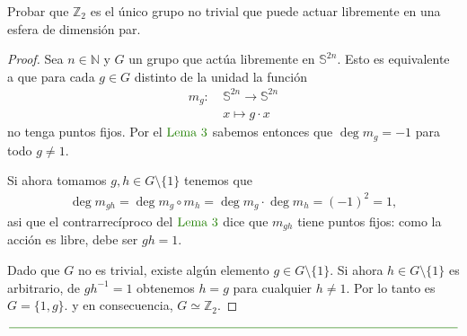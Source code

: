 \documentclass[11pt]{article}
\newcommand{\N}{\mathbb{N}}
\newcommand{\Z}{\mathbb{Z}}
\newcommand{\Ss}{\mathbb{S}}
\newcommand{\paint}[1]{\color{color}{#1}}
\newenvironment{exercise}[2][Ejercicio]{\begin{trivlist}
\item[\hskip \labelsep \paint{{\bfseries #1}}\hskip \labelsep {\bfseries #2.}]}{\end{trivlist}}
\begin{document}
\begin{exercise}{1} Probar que $\Z_2$ es el \'unico grupo no trivial que puede actuar libremente en una esfera de dimensi\'on par.
\end{exercise}
\begin{proof} Sea $n \in \N$ y $G$ un grupo que act\'ua libremente en $\Ss^{2n}$. Esto es equivalente a que para cada $g \in G$ distinto de la unidad la funci\'on 
\begin{align*}
m_g : \ & \Ss^{2n} \rightarrow \Ss^{2n}\\
&x \longmapsto g \cdot x
\end{align*}
no tenga puntos fijos. Por el $\paint{\text{Lema $3$}}$ sabemos entonces que $\deg m_g = -1$ para todo $g \neq 1$. 

Si ahora tomamos $g,h \in G \setminus \{1\}$ tenemos que
\begin{align*}
\deg m_{gh} = \deg m_g \circ m_h = \deg m_g \cdot \deg m_h = (-1)^2 = 1,
\end{align*}
asi que el contrarrec\'iproco del $\paint{\text{Lema $3$}}$ dice que $m_{gh}$ tiene puntos fijos: como la acci\'on es libre, debe ser $gh = 1$. 

Dado que $G$ no es trivial, existe alg\'un elemento $g \in G \setminus \{1\}$. Si ahora $h \in G \setminus \{1\}$ es arbitrario, de $gh^{-1} = 1$ obtenemos $h = g$ para cualquier $h \neq 1$. Por lo tanto es $G = \{1,g\}$. y en consecuencia, $G \simeq \Z_2$.
\end{proof}

\begin{center}
$\paint{
\rule{400pt}{0.5pt}
}$
\vspace{10pt}
\end{center}
\end{document}
